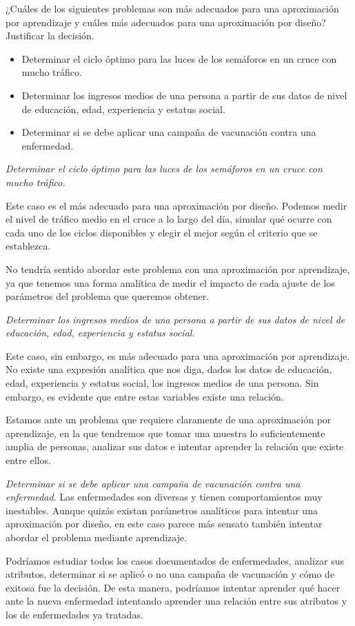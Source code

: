 \documentclass[a4paper, 11pt]{article}
\begin{document}
    \begin{ejercicio}
        ¿Cuáles de los siguientes problemas son más adecuados para una aproximación por aprendizaje y cuáles más adecuados para una aproximación por diseño? Justificar la decisión.
        \begin{itemize}
            \item Determinar el ciclo óptimo para las luces de los semáforos en un cruce con mucho tráfico.
            \item Determinar los ingresos medios de una persona a partir de sus datos de nivel de educación, edad, experiencia y estatus social.
            \item Determinar si se debe aplicar una campaña de vacunación contra una enfermedad.
        \end{itemize}
    \end{ejercicio}

    \begin{solucion}
        \emph{Determinar el ciclo óptimo para las luces de los semáforos en un cruce con mucho tráfico.}

        Este caso es el más adecuado para una aproximación por diseño. Podemos medir el nivel de tráfico medio en el cruce a lo largo del día, simular qué ocurre con cada uno de los ciclos disponibles y elegir el mejor según el criterio que se establezca.

        No tendría sentido abordar este problema con una aproximación por aprendizaje, ya que tenemos una forma analítica de medir el impacto de cada ajuste de los parámetros del problema que queremos obtener.

        \emph{Determinar los ingresos medios de una persona a partir de sus datos de nivel de educación, edad, experiencia y estatus social.}

        Este caso, sin embargo, es más adecuado para una aproximación por aprendizaje. No existe una expresión analítica que nos diga, dados los datos de educación, edad, experiencia y estatus social, los ingresos medios de una persona. Sin embargo, es evidente que entre estas variables existe una relación.

        Estamos ante un problema que requiere claramente de una aproximación por aprendizaje, en la que tendremos que tomar una muestra lo suficientemente amplia de personas, analizar sus datos e intentar aprender la relación que existe entre ellos.

        \emph{Determinar si se debe aplicar una campaña de vacunación contra una enfermedad.}
        Las enfermedades son diversas y tienen comportamientos muy inestables. Aunque quizás existan parámetros analíticos para intentar una aproximación por diseño, en este caso parece más sensato también intentar abordar el problema mediante aprendizaje.

        Podríamos estudiar todos los casos documentados de enfermedades, analizar sus atributos, determinar si se aplicó o  no una campaña de vacunación y cómo de exitosa fue la decisión. De esta manera, podríamos intentar aprender qué hacer ante la nueva enfermedad intentando aprender una relación entre sus atributos y los de enfermedades ya tratadas.
    \end{solucion}
\end{document}
